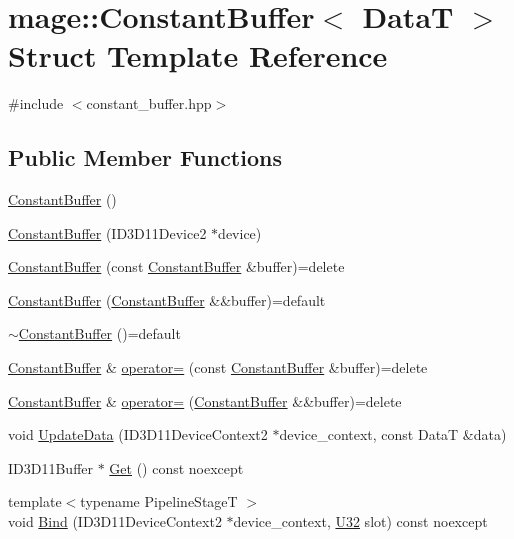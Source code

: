 \hypertarget{structmage_1_1_constant_buffer}{}\section{mage\+:\+:Constant\+Buffer$<$ DataT $>$ Struct Template Reference}
\label{structmage_1_1_constant_buffer}


{\ttfamily \#include $<$constant\+\_\+buffer.\+hpp$>$}

\subsection*{Public Member Functions}
\begin{DoxyCompactItemize}
\item 
\hyperlink{structmage_1_1_constant_buffer_a3badd88f8570d6622f6eb33c7420a87d}{Constant\+Buffer} ()
\item 
\hyperlink{structmage_1_1_constant_buffer_ad2b449d2b39c7973a102e718282796dd}{Constant\+Buffer} (I\+D3\+D11\+Device2 $\ast$device)
\item 
\hyperlink{structmage_1_1_constant_buffer_a67fe42cb52e63e38474b6c65341fbe82}{Constant\+Buffer} (const \hyperlink{structmage_1_1_constant_buffer}{Constant\+Buffer} \&buffer)=delete
\item 
\hyperlink{structmage_1_1_constant_buffer_a851570293d8eeb47f83749f8f54864ee}{Constant\+Buffer} (\hyperlink{structmage_1_1_constant_buffer}{Constant\+Buffer} \&\&buffer)=default
\item 
\hyperlink{structmage_1_1_constant_buffer_a874e9507ea3b6d2f630f061c2fc6d2d0}{$\sim$\+Constant\+Buffer} ()=default
\item 
\hyperlink{structmage_1_1_constant_buffer}{Constant\+Buffer} \& \hyperlink{structmage_1_1_constant_buffer_acb1a4f4b656073609075b5e89dea6973}{operator=} (const \hyperlink{structmage_1_1_constant_buffer}{Constant\+Buffer} \&buffer)=delete
\item 
\hyperlink{structmage_1_1_constant_buffer}{Constant\+Buffer} \& \hyperlink{structmage_1_1_constant_buffer_ad050b1f0f03a5fcd2b51977a744781a3}{operator=} (\hyperlink{structmage_1_1_constant_buffer}{Constant\+Buffer} \&\&buffer)=delete
\item 
void \hyperlink{structmage_1_1_constant_buffer_a7c9a4a2134ebebacfad63b28263f716e}{Update\+Data} (I\+D3\+D11\+Device\+Context2 $\ast$device\+\_\+context, const DataT \&data)
\item 
I\+D3\+D11\+Buffer $\ast$ \hyperlink{structmage_1_1_constant_buffer_a6b8fcbd873ffbda96d7412c581d5a29a}{Get} () const noexcept
\item 
{\footnotesize template$<$typename Pipeline\+StageT $>$ }\\void \hyperlink{structmage_1_1_constant_buffer_ad091e8de90f391fedaf6f8bbe39eeebb}{Bind} (I\+D3\+D11\+Device\+Context2 $\ast$device\+\_\+context, \hyperlink{namespacemage_a41c104c036fba3756a74e19f793eeaa1}{U32} slot) const noexcept
\end{DoxyCompactItemize}
